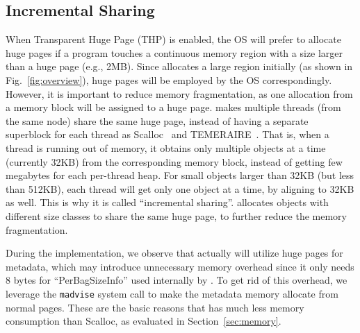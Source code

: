 \subsection{Incremental Sharing}
\label{sec:hugepages}
When Transparent Huge Page (THP) is enabled, the OS will prefer to allocate huge pages if a program touches a continuous memory region with a size larger than a huge page (e.g., 2MB). Since \NM{} allocates a large region initially (as shown in Fig.~\ref{fig:overview}), huge pages will be employed by the OS correspondingly. However, it is important to reduce memory fragmentation, as one allocation from a memory block will be assigned to a huge page.
\NM{} makes multiple threads (from the same node) share the same huge page, instead of having a separate superblock for each thread as Scalloc~\cite{Scalloc} and TEMERAIRE~\cite{TEMERAIRE}. That is, when a thread is running out of memory, it obtains only multiple objects at a time (currently 32KB) from the corresponding memory block, instead of getting few megabytes for each per-thread heap. For small objects larger than 32KB (but less than 512KB), each thread will get only one object at a time, by aligning to 32KB as well.  This is why it is called ``incremental sharing''. 
\NM{} allocates objects with different size classes to share the same huge page, to further reduce the memory fragmentation. 

During the implementation, we observe that \NM{} actually will utilize huge pages for metadata, which may introduce unnecessary memory overhead since it only needs 8 bytes for ``PerBagSizeInfo'' used internally by \NM{}. To get rid of this overhead, we leverage the \texttt{madvise} system call to make the metadata memory allocate from normal pages. These are the basic reasons that \NM{} has much less memory consumption than Scalloc, as evaluated in Section~\ref{sec:memory}. 

